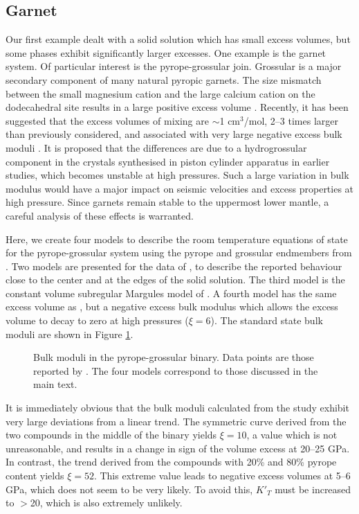 \subsection{Garnet}
Our first example dealt with a solid solution which has small excess volumes, but some phases exhibit significantly larger excesses. One example is the garnet system. Of particular interest is the pyrope-grossular join. Grossular is a major secondary component of many natural pyropic garnets. The size mismatch between the small magnesium cation and the large calcium cation on the dodecahedral site results in a large positive excess volume \citep{NCK1977, BG1997, GCT1996}. Recently, it has been suggested that the excess volumes of mixing are $\sim$1 cm$^3$/mol, 2--3 times larger than previously considered, and associated with very large negative excess bulk moduli \citep{DCW2015}. It is proposed that the differences are due to a hydrogrossular component in the crystals synthesised in piston cylinder apparatus in earlier studies, which becomes unstable at high pressures. Such a large variation in bulk modulus would have a major impact on seismic velocities and excess properties at high pressure. Since garnets remain stable to the uppermost lower mantle, a careful analysis of these effects is warranted.

Here, we create four models to describe the room temperature equations of state for the pyrope-grossular system using the pyrope and grossular endmembers from \cite{HP2011}. Two models are presented for the data of \citep{DCW2015}, to describe the reported behaviour close to the center and at the edges of the solid solution. The third model is the constant volume subregular Margules model of \cite{GCT1996}. A fourth model has the same excess volume as \cite{GCT1996}, but a negative excess bulk modulus which allows the excess volume to decay to zero at high pressures ($\xi=6$). The standard state bulk moduli are shown in Figure \ref{fig:K_T_pyrope_grossular}.


\begin{figure}[ht!]
  \centering
  \caption{Bulk moduli in the pyrope-grossular binary. Data points are those reported by \cite{DCW2015}. The four models correspond to those discussed in the main text.}
  \label{fig:K_T_pyrope_grossular}
\end{figure}

It is immediately obvious that the bulk moduli calculated from the \cite{DCW2015} study exhibit very large deviations from a linear trend. The symmetric curve derived from the two compounds in the middle of the binary yields $\xi=10$, a value which is not unreasonable, and results in a change in sign of the volume excess at 20--25 GPa. In contrast, the trend derived from the compounds with 20\% and 80\% pyrope content yields $\xi=52$. This extreme value leads to negative excess volumes at 5--6 GPa, which does not seem to be very likely. To avoid this, $K'_T$ must be increased to $>$20, which is also extremely unlikely.

